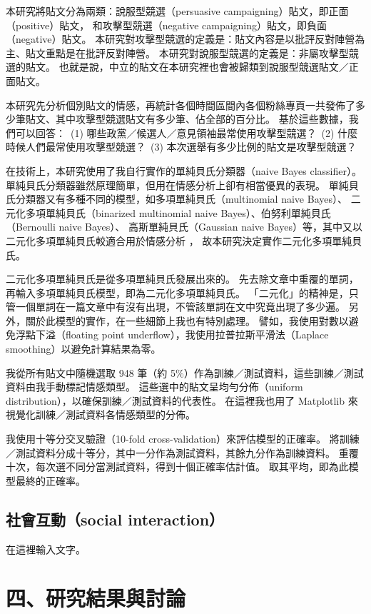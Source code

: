 \documentclass[letterpaper, 10pt, conference]{ieeeconf}   %
\begin{document}
\begin{CJK}{UTF8}{bsmi}
本研究將貼文分為兩類：說服型競選（persuasive campaigning）貼文，即正面（positive）貼文，%
和攻擊型競選（negative campaigning）貼文，即負面（negative）貼文。%
本研究對攻擊型競選的定義是：貼文內容是以批評反對陣營為主、貼文重點是在批評反對陣營。%
本研究對說服型競選的定義是：非屬攻擊型競選的貼文。%
也就是說，中立的貼文在本研究裡也會被歸類到說服型競選貼文／正面貼文。%

本研究先分析個別貼文的情感，再統計各個時間區間內各個粉絲專頁一共發佈了多少筆貼文、其中攻擊型競選貼文有多少筆、佔全部的百分比。%
基於這些數據，我們可以回答：%
\,(1) 哪些政黨／候選人／意見領袖最常使用攻擊型競選？%
\,(2) 什麼時候人們最常使用攻擊型競選？%
\,(3) 本次選舉有多少比例的貼文是攻擊型競選？%

在技術上，本研究使用了我自行實作的單純貝氏分類器（naive Bayes classifier）\cite{c13}。%
單純貝氏分類器雖然原理簡單，但用在情感分析上卻有相當優異的表現。%
單純貝氏分類器又有多種不同的模型，如多項單純貝氏（multinomial naive Bayes）、%
二元化多項單純貝氏（binarized multinomial naive Bayes）、伯努利單純貝氏（Bernoulli naive Bayes）、%
高斯單純貝氏（Gaussian naive Bayes）等，其中又以二元化多項單純貝氏較適合用於情感分析 \cite{c14}，%
故本研究決定實作二元化多項單純貝氏。%

二元化多項單純貝氏是從多項單純貝氏發展出來的。%
先去除文章中重覆的單詞，再輸入多項單純貝氏模型，即為二元化多項單純貝氏。%
「二元化」的精神是，只管一個單詞在一篇文章中有沒有出現，不管該單詞在文中究竟出現了多少遍。%
另外，關於此模型的實作，在一些細節上我也有特別處理。%
譬如，我使用對數以避免浮點下溢（floating point underflow），我使用拉普拉斯平滑法（Laplace smoothing）以避免計算結果為零。%

我從所有貼文中隨機選取 948 筆（約 5\%）作為訓練／測試資料，這些訓練／測試資料由我手動標記情感類型。%
這些選中的貼文呈均勻分佈（uniform distribution），以確保訓練／測試資料的代表性。%
在這裡我也用了 Matplotlib 來視覺化訓練／測試資料各情感類型的分佈。%

我使用十等分交叉驗證（10-fold cross-validation）來評估模型的正確率。%
將訓練／測試資料分成十等分，其中一分作為測試資料，其餘九分作為訓練資料。%
重覆十次，每次選不同分當測試資料，得到十個正確率估計值。%
取其平均，即為此模型最終的正確率。%

\subsection*{社會互動（social interaction）}

在這裡輸入文字。%

\section*{四、研究結果與討論}


\end{CJK}
\end{document}
